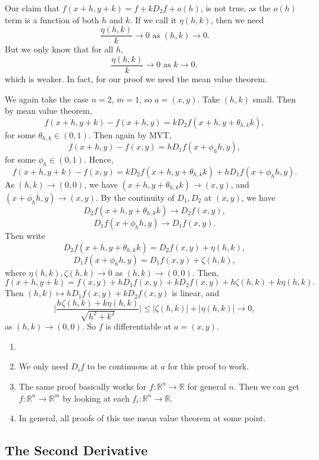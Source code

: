 \documentclass[12pt]{article}
\begin{document}
Our claim that $f(x+h, y+k) = f + kD_2f + o(h)$, is not true, as the $o(h)$ term is a function of both $h$ and $k$. If we call it $\eta(h, k)$, then we need
\[
	\frac{\eta(h, k)}{k} \to 0 \text{ as } (h, k) \to 0
.\]
But we only know that for all $h$,
\[
	\frac{\eta(h, k)}{k} \to 0 \text{ as } k \to 0
,\]
which is weaker. In fact, for our proof we need the mean value theorem.

\begin{proofbox}
	We again take the case $n = 2$, $m = 1$, so $a = (x, y)$. Take $(h, k)$ small. Then by mean value theorem,
	\[
	f(x+h, y+k) - f(x+h, y) = k D_2f(x+h, y+\theta_{h,k}k)
	,\]
	for some $\theta_{h,k} \in (0, 1)$. Then again by MVT,
	\[
	f(x+h, y) - f(x, y) = h D_1 f(x+\phi_h h, y)
	,\]
	for some $\phi_h \in (0, 1)$. Hence,
	\[
	f(x+h, y+k) - f(x, y) = kD_2f(x+h, y+\theta_{h,k}k) + h D_1 f(x+\phi_h h, y)
	.\]
	As $(h, k) \to (0, 0)$, we have $(x+h, y+ \theta_{h,k}k) \to (x, y)$, and $(x + \phi_h h, y) \to (x, y)$. By the continuity of $D_1, D_2$ at $(x, y)$, we have
	\[
	D_2f(x+h, y+\theta_{h,k}k) \to D_2f(x, y)
	,\]
	\[
	D_1 f(x+ \phi_h h, y) \to D_1f(x, y)
	.\]
	Then write
	\[
	D_2f(x+h,y+\theta_{h,k}k) = D_2f(x,y) + \eta(h, k)
	,\]
	\[
	D_1f(x+\phi_h h, y) = D_1f(x, y) + \zeta(h, k)
	,\]
	where $\eta(h, k), \zeta(h, k) \to 0$ as $(h, k) \to (0, 0)$. Then,
	\[
	f(x+h, y+k) = f(x, y) + hD_1f(x, y) + kD_2f(x, y) + h\zeta(h,k) + k\eta(h, k)
	.\]
	Then $(h,k) \mapsto hD_1f(x, y) + kD_2f(x, y)$ is linear, and
	\[
		\biggl| \frac{h \zeta(h, k) + k \eta(h, k)}{\sqrt{h^2 + k^2}} \biggr| \leq |\zeta(h,k)| + |\eta(h,k)| \to 0
	,\]
	as $(h, k) \to (0, 0)$. So $f$ is differentiable at $a = (x, y)$.
\end{proofbox}

\begin{remark}
	\begin{enumerate}[1.]
		\item[]
		\item We only need $D_if$ to be continuous at $a$ for this proof to work.
		\item The same proof basically works for $f : \mathbb{R}^{n} \to \mathbb{R}$ for general $n$. Then we can get $f : \mathbb{R}^{n} \to \mathbb{R}^{m}$ by looking at each $f_i : \mathbb{R}^{n} \to \mathbb{R}$.
		\item In general, all proofs of this use mean value theorem at some point.
	\end{enumerate}
\end{remark}

\subsection{The Second Derivative}
\label{sub:the_second_derivative}
\end{document}
